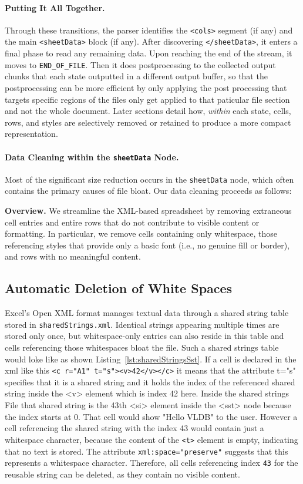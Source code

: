 \paragraph{Putting It All Together.}
Through these transitions, the parser identifies the \texttt{<cols>} segment (if any) and the main \texttt{<sheetData>} block (if any). After discovering \texttt{</sheetData>}, it enters a final phase to read any remaining data. Upon reaching the end of the stream, it moves to \texttt{END\_OF\_FILE}. Then it does postprocessing to the collected output chunks that each state outputted in a different output buffer, so that the postprocessing can be more efficient by only applying the post processing that targets specific regions of the files only get applied to that paticular file section and not the whole document.  Later sections detail how, \emph{within} each state, cells, rows, and styles are selectively removed or retained to produce a more compact representation.

\paragraph{Data Cleaning within the \texttt{sheetData} Node.}
Most of the significant size reduction occurs in the \texttt{sheetData} node, which often contains the primary causes of file bloat. Our data cleaning proceeds as follows:

\noindent
\textbf{Overview.} We streamline the XML-based spreadsheet by removing extraneous cell entries and entire rows that do not contribute to visible content or formatting. In particular, we remove cells containing only whitespace, those referencing styles that provide only a basic font (i.e., no genuine fill or border), and rows with no meaningful content.

\subsection{Automatic Deletion of White Spaces}

Excel’s Open XML format manages textual data through a shared string table stored in \texttt{sharedStrings.xml}. Identical strings appearing multiple times are stored only once, but whitespace-only entries can also reside in this table and cells referencing those whitespaces  bloat the file.  Such a shared strings table would loke like as shown Listing~\ref{lst:sharedStringsSst}. If a cell is declared in the xml like this \lstinline|<c r="A1" t="s"><v>42</v></c>| it means that the attribute t="s" specifies that it is a shared string and it holds the index of the referenced shared string inside the <v> element which is index 42 here. Inside the shared strings File that shared string is the 43th <si> element inside the <sst> node because the index starts at 0. That cell would show "Hello VLDB" to the user. However a cell referencing the shared string with the index 43 would contain just a whitespace character, because the content of the \texttt{<t>} element is empty, indicating that no text is stored. The attribute \texttt{xml:space="preserve"} suggests that this represents a whitespace character. Therefore, all cells referencing index \texttt{43} for the reusable string can be deleted, as they contain no visible content.

